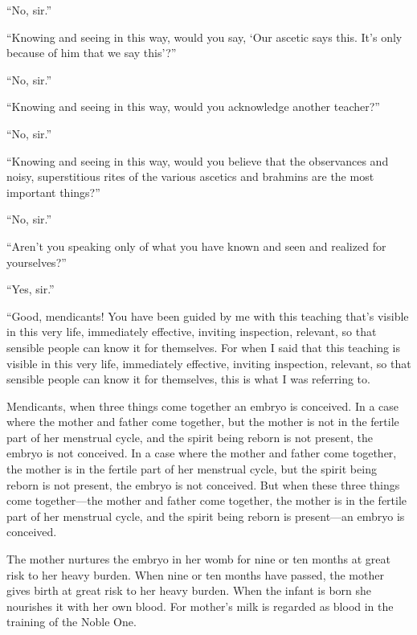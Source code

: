 \documentclass[12pt,openany]{book}%
\begin{document}
“No, sir.” 

“Knowing and seeing in this way, would you say, ‘Our ascetic says this. It’s only because of him that we say this’?” 

“No, sir.” 

“Knowing and seeing in this way, would you acknowledge another teacher?” 

“No, sir.” 

“Knowing and seeing in this way, would you believe that the observances and noisy, superstitious rites of the various ascetics and brahmins are the most important things?” 

“No, sir.” 

“Aren’t you speaking only of what you have known and seen and realized for yourselves?” 

“Yes, sir.” 

“Good, mendicants! You have been guided by me with this teaching that’s visible in this very life, immediately effective, inviting inspection, relevant, so that sensible people can know it for themselves. For when I said that this teaching is visible in this very life, immediately effective, inviting inspection, relevant, so that sensible people can know it for themselves, this is what I was referring to. 

Mendicants, when three things come together an embryo is conceived. In a case where the mother and father come together, but the mother is not in the fertile part of her menstrual cycle, and the spirit being reborn is not present, the embryo is not conceived. In a case where the mother and father come together, the mother is in the fertile part of her menstrual cycle, but the spirit being reborn is not present, the embryo is not conceived. But when these three things come together—the mother and father come together, the mother is in the fertile part of her menstrual cycle, and the spirit being reborn is present—an embryo is conceived. 

The mother nurtures the embryo in her womb for nine or ten months at great risk to her heavy burden. When nine or ten months have passed, the mother gives birth at great risk to her heavy burden. When the infant is born she nourishes it with her own blood. For mother’s milk is regarded as blood in the training of the Noble One. 
\end{document}
